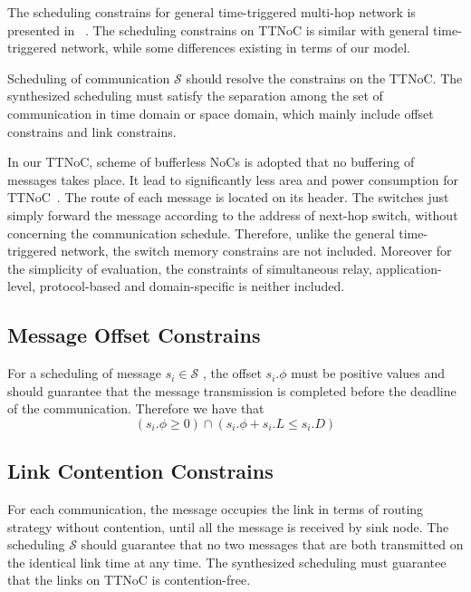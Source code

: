 \documentclass[journal]{IEEEtran}
\newcommand{\calS}{\mathcal{S}}
\begin{document}
The scheduling constrains for general time-triggered multi-hop network is presented in ~\cite{DBLP:conf/rtss/Steiner10}. 
The scheduling constrains on TTNoC is similar with general time-triggered network, 
while some differences existing in terms of our model.

Scheduling of communication $\calS$ should resolve the constrains on the TTNoC. 
The synthesized scheduling must satisfy the separation among the set of communication in time domain or space domain, which mainly include offset constrains and link constrains.

In our TTNoC, scheme of bufferless NoCs is adopted that no buffering of messages takes place. 
It lead to significantly less area and power consumption for TTNoC~\cite{DBLP:journals/tpds/ShpinerKLCK15}.
The route of each message is located on its header.
The switches just simply forward the message according to the address of next-hop switch, without concerning the communication schedule. Therefore, unlike the general time-triggered network, the switch memory constrains are not included.
Moreover for the simplicity of evaluation, the constraints of simultaneous relay, application-level, protocol-based and domain-specific is neither included.

\subsection{Message Offset Constrains}

For a scheduling of message $s_{i}\in\calS$ , the offset $s_i.\phi$  must be positive values and should guarantee that the message transmission is completed before the deadline of the communication. Therefore we have that
\begin{equation}
	(s_i.\phi
	\geq 0)
	\cap
	(s_i.\phi + s_i.L
	\leq
	s_i.D)
\end{equation}

\subsection{Link Contention Constrains}

For each communication, the message occupies the link in terms of routing strategy without contention, 
until all the message is received by sink node.
The scheduling $\calS$ should guarantee that no two messages that are both transmitted on the identical link time at any time. 
The synthesized scheduling must guarantee that the links on TTNoC is contention-free.
\end{document}
